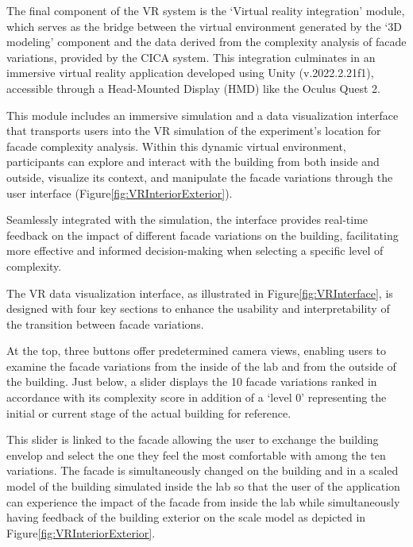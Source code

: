 

The final component of the VR system is the `Virtual reality integration' module, which serves as the bridge between the virtual environment generated by the `3D modeling' component and the data derived from the complexity analysis of facade variations, provided by the CICA system.
This integration culminates in an immersive virtual reality application developed using Unity (v.2022.2.21f1), accessible through a Head-Mounted Display (HMD) like the Oculus Quest 2.

This module includes an immersive simulation and a data visualization interface that transports users into the VR simulation of the experiment's location for facade complexity analysis.
Within this dynamic virtual environment, participants can explore and interact with the building from both inside and outside, visualize its context, and manipulate the facade variations through the user interface (Figure\ref{fig:VRInteriorExterior}).

Seamlessly integrated with the simulation, the interface provides real-time feedback on the impact of different facade variations on the building, facilitating more effective and informed decision-making when selecting a specific level of complexity.


The VR data visualization interface, as illustrated in Figure\ref{fig:VRInterface}, is designed with four key sections to enhance the usability and interpretability of the transition between facade variations.


At the top, three buttons offer predetermined camera views, enabling users to examine the facade variations from the inside of the lab and from the outside of the building.
Just below, a slider displays the 10 facade variations ranked in accordance with its complexity score in addition of a `level 0' representing the initial or current stage of the actual building for reference.

This slider is linked to the facade allowing the user to exchange the building envelop and select the one they feel the most comfortable with among the ten variations.
The facade is simultaneously changed on the building and in a scaled model of the building simulated inside the lab so that the user of the application can experience the impact of the facade from inside the lab while simultaneously having feedback of the building exterior on the scale model as depicted in Figure\ref{fig:VRInteriorExterior}.

